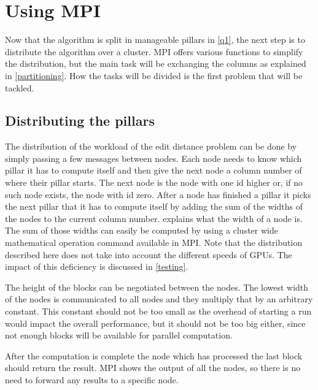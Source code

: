 \section{Using MPI} \label{q2}
Now that the algorithm is split in manageable pillars in \cref{q1}, the next step is to distribute the algorithm over a cluster.
MPI offers various functions to simplify the distribution, but the main task will be exchanging the columns as explained in \cref{partitioning}.
How the tasks will be divided is the first problem that will be tackled.

\subsection{Distributing the pillars}
The distribution of the workload of the edit distance problem can be done by simply passing a few messages between nodes.
Each node needs to know which pillar it has to compute itself and then give the next node a column number of where their pillar starts.
The next node is the node with one id higher or, if no such node exists, the node with id zero.
After a node has finished a pillar it picks the next pillar that it has to compute itself by adding the sum of the widths of the nodes to the current column number.
 explains what the width of a node is.
The sum of those widths can easily be computed by using a cluster wide mathematical operation command available in MPI.
Note that the distribution described here does not take into account the different speeds of GPUs.
The impact of this deficiency is discussed in \cref{testing}.

The height of the blocks can be negotiated between the nodes.
The lowest width of the nodes is communicated to all nodes and they multiply that by an arbitrary constant.
This constant should not be too small as the overhead of starting a run would impact the overall performance, but it should not be too big either, since not enough blocks will be available for parallel computation.

After the computation is complete the node which has processed the last block should return the result.
MPI shows the output of all the nodes, so there is no need to forward any results to a specific node.

